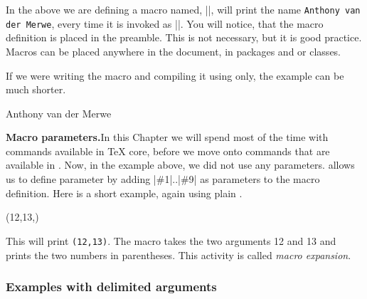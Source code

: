 
\begin{multicols}{2}
In the above we are defining a macro named, |\myshortcut|, will print the name \texttt{Anthony van der Merwe}, every time it is invoked as |\myshortcut|. You will notice, that the macro definition is placed in the preamble. This is not necessary, but it is good practice. Macros can be placed anywhere in the document, in packages and or classes.

If we were writing the macro and compiling it using \tex only, the example can be much shorter.
\end{multicols}

\begin{teXXX}
\def\myshortcut{Anthony van der Merwe}
\myshortcut
\bye
\end{teXXX}


\begin{multicols}{2}
\textbf{Macro parameters.}\quad In this Chapter we will spend most of the time with commands available in TeX core, before we move onto commands that are available in \latex. Now, in the example above, we did not use any parameters. \tex allows us to define parameter by adding |\#1|..|\#9| as parameters to the macro definition. Here is a short example, again using plain \tex. 
\end{multicols}
\begin{teXXX}
\def\twonumbers#1#2{(#1,#2)} 
\twonumbers{12,13}
\bye
\end{teXXX}

\def\twonumbers#1#2{(#1,#2)}

This will print \texttt{\twonumbers{12}{13}}. The macro takes the two arguments 12 and 13  and prints the two numbers in parentheses. This activity is called \textit{macro expansion}.
 
\subsubsection{Examples with delimited arguments}

